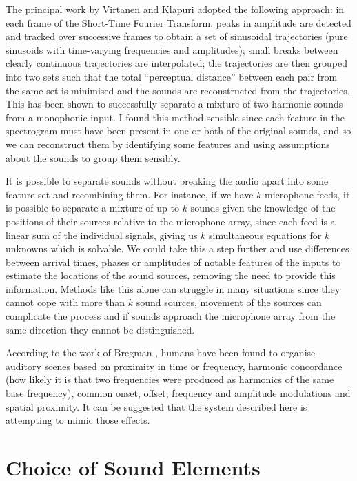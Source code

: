 \documentclass[10pt,twoside,a4paper]{report}
\begin{document}
The principal work by Virtanen and Klapuri \cite{virtanen2000separation} adopted the following approach: in each frame of the Short-Time Fourier Transform, peaks in amplitude are detected and tracked over successive frames to obtain a set of sinusoidal trajectories (pure sinusoids with time-varying frequencies and amplitudes); small breaks between clearly continuous trajectories are interpolated; the trajectories are then grouped into two sets such that the total ``perceptual distance'' between each pair from the same set is minimised and the sounds are reconstructed from the trajectories. This has been shown to successfully separate a mixture of two harmonic sounds from a monophonic input. I found this method sensible since each feature in the spectrogram must have been present in one or both of the original sounds, and so we can reconstruct them by identifying some features and using assumptions about the sounds to group them sensibly.

It is possible to separate sounds without breaking the audio apart into some feature set and recombining them. For instance, if we have $ k $ microphone feeds, it is possible to separate a mixture of up to $ k $ sounds given the knowledge of the positions of their sources relative to the microphone array, since each feed is a linear sum of the individual signals, giving us $ k $ simultaneous equations for $ k $ unknowns which is solvable. We could take this a step further and use differences between arrival times, phases or amplitudes of notable features of the inputs to estimate the locations of the sound sources, removing the need to provide this information. Methods like this alone can struggle in many situations since they cannot cope with more than $ k $ sound sources, movement of the sources can complicate the process and if sounds approach the microphone array from the same direction they cannot be distinguished.

According to the work of Bregman \cite{bregman1994auditory}, humans have been found to organise auditory scenes based on proximity in time or frequency, harmonic concordance (how likely it is that two frequencies were produced as harmonics of the same base frequency), common onset, offset, frequency and amplitude modulations and spatial proximity. It can be suggested that the system described here is attempting to mimic those effects.

\section{Choice of Sound Elements}
\end{document}
